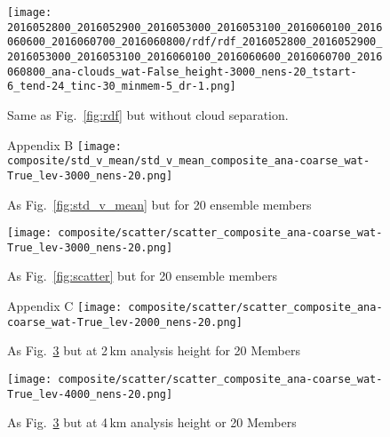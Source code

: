 \documentclass[a4paper, 12pt]{article}
\begin{document}
\begin{figure}[ht]
\noindent \centering
\texttt{[image: 2016052800\_2016052900\_2016053000\_2016053100\_2016060100\_2016060600\_2016060700\_2016060800/rdf/rdf\_2016052800\_2016052900\_2016053000\_2016053100\_2016060100\_2016060600\_2016060700\_2016060800\_ana-clouds\_wat-False\_height-3000\_nens-20\_tstart-6\_tend-24\_tinc-30\_minmem-5\_dr-1.png]}\\
\caption{Same as Fig.~\ref{fig:rdf} but without cloud separation.} \label{fig:rdf_nowater}
\end{figure}
 \clearpage
\begin{figure}[ht]
\noindent \centering
Appendix B
\texttt{[image: composite/std\_v\_mean/std\_v\_mean\_composite\_ana-coarse\_wat-True\_lev-3000\_nens-20.png]}\\
\caption{As Fig.~\ref{fig:std_v_mean} but for 20 ensemble members} \label{fig:std_v_mean_20mem}
\end{figure}

\begin{figure}[ht]
\noindent \centering
\texttt{[image: composite/scatter/scatter\_composite\_ana-coarse\_wat-True\_lev-3000\_nens-20.png]}\\
\caption{As Fig.~\ref{fig:scatter} but for 20 ensemble members} \label{fig:scatter_20mem}
\end{figure}
 \clearpage
\begin{figure}[ht]
\noindent \centering
Appendix C
\texttt{[image: composite/scatter/scatter\_composite\_ana-coarse\_wat-True\_lev-2000\_nens-20.png]}\\
\caption{As Fig.~\ref{fig:scatter_20mem} but at 2\,km analysis height for 20 Members} \label{fig:scatter_2000}
\end{figure}

\begin{figure}[ht]
\noindent \centering
\texttt{[image: composite/scatter/scatter\_composite\_ana-coarse\_wat-True\_lev-4000\_nens-20.png]}\\
\caption{As Fig.~\ref{fig:scatter_20mem} but at 4\,km analysis height or 20 Members} \label{fig:scatter_4000}
\end{figure}
\end{document}

